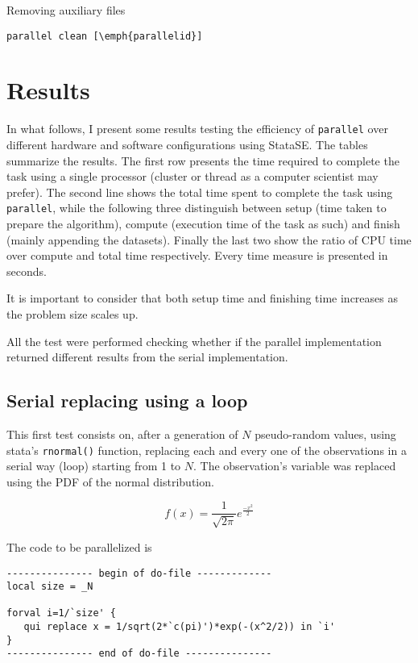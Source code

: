 \documentclass[letterpaper, 10pt]{article}
\begin{document}
Removing auxiliary files

\begin{Verbatim}[commandchars=\\\{\}]
parallel clean [\emph{parallelid}]
\end{Verbatim}

\section{Results}
\def\win1{Intel Core i5 M560 (dual-core)}
\def\unix1{Intel Xeon X470 (octa-core)}

In what follows, I present some results testing the efficiency of {\tt parallel} over different hardware and software configurations using StataSE. The tables summarize the results. The first row presents the time required to complete the task using a single processor (cluster or thread as a computer scientist may prefer). The second line shows the total time spent to complete the task using {\tt parallel}, while the following three distinguish between setup (time taken to prepare the algorithm), compute (execution time of the task as such) and finish (mainly appending the datasets). Finally the last two show the ratio of CPU time over compute and total time respectively. Every time measure is presented in seconds.

It is important to consider that both setup time and finishing time increases as the problem size scales up.

All the test were performed checking whether if the parallel implementation returned different results from the serial implementation.

\subsection{Serial replacing using a loop}

This first test consists on, after a generation of $N$ pseudo-random values, using stata's {\tt rnormal()} function, replacing each and every one of the observations in a serial way (loop) starting from 1 to $N$. The observation's variable was replaced using the PDF of the normal distribution.

\begin{equation}
f(x) = \frac{1}{\sqrt{2\pi}}e^{\frac{-x^2}{2}}
\end{equation}

The code to be parallelized is

\begin{Verbatim}[tabsize=4, fontsize=\footnotesize]
--------------- begin of do-file -------------
local size = _N

forval i=1/`size' {
   qui replace x = 1/sqrt(2*`c(pi)')*exp(-(x^2/2)) in `i'
}
--------------- end of do-file ---------------
\end{Verbatim}
\end{document}
